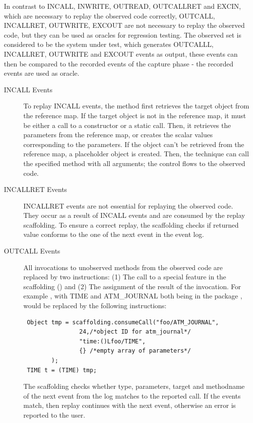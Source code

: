 In contrast to INCALL, INWRITE, OUTREAD, OUTCALLRET and EXCIN, which are necessary to replay the observed code correctly, OUTCALL, INCALLRET, OUTWRITE, EXCOUT are not necessary to replay the observed code, but they can be used as oracles for regression testing. The observed set is considered to be the system under test, which generates OUTCALLL, INCALLRET, OUTWRITE and EXCOUT events as output, these events can then be compared to the recorded events of the capture phase - the recorded events are used as oracle.

\begin{description}
 \item [INCALL Events] To replay INCALL events, the method first retrieves the target object from the reference map. If the target object is not in the reference map, it must be either a call to a constructor or a static call. Then, it retrieves the parameters from the reference map, or creates the scalar values corresponding to the parameters. If the object can't be retrieved from the reference map, a placeholder object is created. Then, the technique can call the specified method with all arguments; the control flows to the observed code. 
 \item [INCALLRET Events] INCALLRET events are not essential for replaying the observed code. They occur as a result of INCALL events and are consumed by the replay scaffolding. To ensure a correct replay, the scaffolding checks if returned value conforms to the one of the next event in the event log.
 \item [OUTCALL Events] All invocations to unobserved methods from the observed code are replaced by two instructions: (1) The call to a special feature in the scaffolding () and (2) The assignment of the result of the invocation. For example , with TIME and ATM\_JOURNAL both being in the package , would be replaced by the following instructions:
\begin{lstlisting}
 Object tmp = scaffolding.consumeCall("foo/ATM_JOURNAL",
                24,/*object ID for atm_journal*/
                "time:()Lfoo/TIME",
                {} /*empty array of parameters*/
		);
 TIME t = (TIME) tmp;
\end{lstlisting}
The scaffolding checks whether type, parameters, target and methodname of the next event from the log matches to the reported call. If the events match, then replay continues with the next event, otherwise an error is reported to the user.

\end{description}
